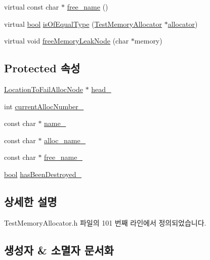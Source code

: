 \begin{DoxyCompactItemize}
\item 
virtual const char $\ast$ \hyperlink{class_test_memory_allocator_aac134aac79b30bc5903d0b2b7cc55b74}{free\+\_\+name} ()
\item 
virtual \hyperlink{avb__gptp_8h_af6a258d8f3ee5206d682d799316314b1}{bool} \hyperlink{class_test_memory_allocator_a3d6a5cc2f6b7a38b3f1d3e0567bf4f93}{is\+Of\+Equal\+Type} (\hyperlink{class_test_memory_allocator}{Test\+Memory\+Allocator} $\ast$\hyperlink{_memory_leak_warning_test_8cpp_a83fc2e9b9142613f7df2bcc3ff8292bc}{allocator})
\item 
virtual void \hyperlink{class_test_memory_allocator_a10f2958f3b7378256e933896ccc93df0}{free\+Memory\+Leak\+Node} (char $\ast$memory)
\end{DoxyCompactItemize}
\subsection*{Protected 속성}
\begin{DoxyCompactItemize}
\item 
\hyperlink{class_location_to_fail_alloc_node}{Location\+To\+Fail\+Alloc\+Node} $\ast$ \hyperlink{class_failable_memory_allocator_abca7541fbe80c2313fd718d9f1244c42}{head\+\_\+}
\item 
int \hyperlink{class_failable_memory_allocator_ac565cda74c1659a4c2400f97a8a0872b}{current\+Alloc\+Number\+\_\+}
\item 
const char $\ast$ \hyperlink{class_test_memory_allocator_a7dac8366c11fbcad2f49d85fe8fc4fbe}{name\+\_\+}
\item 
const char $\ast$ \hyperlink{class_test_memory_allocator_ae5a98ff3b709da10db95a0ed03362548}{alloc\+\_\+name\+\_\+}
\item 
const char $\ast$ \hyperlink{class_test_memory_allocator_a4f7ece205625129df190e624cccf9286}{free\+\_\+name\+\_\+}
\item 
\hyperlink{avb__gptp_8h_af6a258d8f3ee5206d682d799316314b1}{bool} \hyperlink{class_test_memory_allocator_a971604f223534e64d5024d63396b397a}{has\+Been\+Destroyed\+\_\+}
\end{DoxyCompactItemize}


\subsection{상세한 설명}


Test\+Memory\+Allocator.\+h 파일의 101 번째 라인에서 정의되었습니다.



\subsection{생성자 \& 소멸자 문서화}
